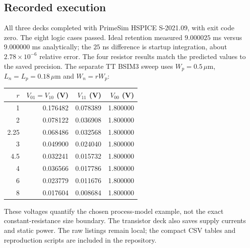 \documentclass[11pt,a4paper]{article}
\begin{document}
\subsection*{Recorded execution}
All three decks completed with PrimeSim HSPICE S-2021.09, with exit code zero.
The eight logic cases passed. Ideal retention measured $9.000025$ ms versus
$9.000000$ ms analytically; the $25$ ns difference is startup integration,
about $2.78\times10^{-6}$ relative error. The four resistor results match
the predicted values to the saved precision. The separate TT BSIM3 sweep
uses $W_p=0.5\,\mu$m, $L_n=L_p=0.18\,\mu$m and $W_n=rW_p$:
\begin{center}\begin{tabular}{rrrr}
\toprule $r$&$V_{01}=V_{10}$ (V)&$V_{11}$ (V)&$V_{00}$ (V)\\\midrule
1&0.176482&0.078389&1.800000\\
2&0.078122&0.036908&1.800000\\
2.25&0.068486&0.032568&1.800000\\
3&0.049900&0.024040&1.800000\\
4.5&0.032241&0.015732&1.800000\\
4&0.036566&0.017786&1.800000\\
6&0.023779&0.011676&1.800000\\
8&0.017604&0.008684&1.800000\\\bottomrule
\end{tabular}\end{center}
These voltages quantify the chosen process-model example, not the exact
constant-resistance size boundary. The transistor deck also saves supply
currents and static power. The raw listings remain local; the compact CSV
tables and reproduction scripts are included in the repository.
\end{document}
